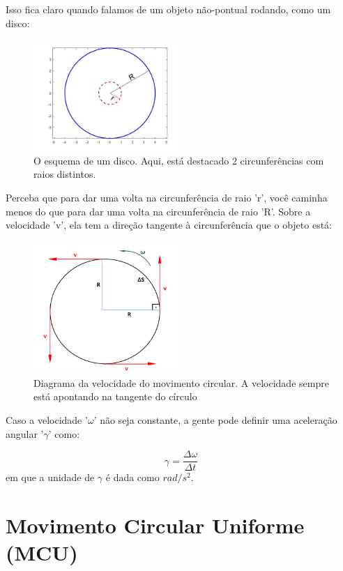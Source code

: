 \documentclass[12pt]{extarticle}
\newcommand{\<}{\langle}
\renewcommand{\>}{\rangle}
\theoremstyle{definition}
\begin{document}
Isso fica claro quando falamos de um objeto não-pontual rodando, como um disco:
\begin{figure}[H]
    \centering
    \includegraphics[width=0.5\textwidth]{disc_rotating.jpg}
    \caption{O esquema de um disco. Aqui, está destacado 2 circunferências com raios distintos.}
    \label{fig:disc}
\end{figure}

Perceba que para dar uma volta na circunferência de raio 'r', você caminha menos do que para dar uma volta na circunferência de raio 'R'. Sobre a velocidade 'v', ela tem a direção tangente à circunferência que o objeto está:
\begin{figure}[H]
    \centering
    \includegraphics[width=0.5\textwidth]{movimento-circular-figura.jpg}
    \caption{Diagrama da velocidade do movimento circular. A velocidade sempre está apontando na tangente do círculo}
    \label{fig:velocity}
\end{figure}

Caso a velocidade '$\omega$' não seja constante, a gente pode definir uma aceleração angular '$\gamma$' como:

\begin{equation}
    \gamma = \frac{\Delta \omega}{\Delta t}
\end{equation}
\noindent em que a unidade de $\gamma$ é dada como $rad/s^2$.

\section{Movimento Circular Uniforme (MCU)}
\end{document}
